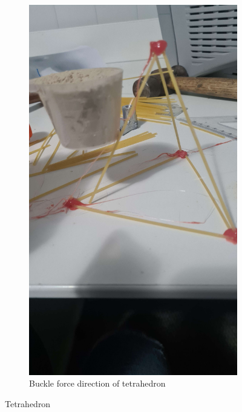 \documentclass{report}
\newcommand{\subimgw}{.7\linewidth}
\begin{document}
\begin{figure}[H]
\begin{subfigure}{.5\textwidth}
		\label{fig:tetrehedra:a}
	\end{subfigure}%
	\begin{subfigure}{.5\textwidth}
		\centering
		\includegraphics[width=\subimgw,trim={0 20cm 0 0},clip]{tetrehedra-b}
		\caption{Buckle force direction of tetrahedron}

		\label{fig:tetrehedra:untranslated}
	\end{subfigure}

	\caption{Tetrahedron}
	\label{fig:tetrehedra}
\end{figure}
\end{document}
